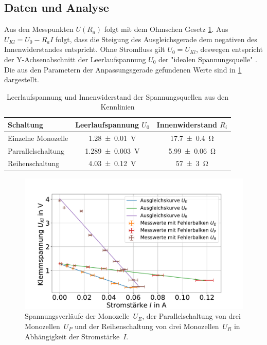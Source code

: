 \subsection{Daten und Analyse}


Aus den Messpunkten $U(R_a)$ folgt mit dem Ohmschen Gesetz \cref{fig:batt-ges-u}. Aus $U_{Kl}=U_0-R_a I$ folgt, dass die Steigung des Ausgleichsgerade dem negativen des Innenwiderstandes entspricht. Ohne Stromfluss gilt $U_0=U_{Kl}$, deswegen entspricht der Y-Achsenabschnitt der Leerlaufspannung $U_0$ der "idealen Spannungsquelle" \cite{lw}. Die aus den Parametern der Anpassungsgerade gefundenen Werte sind in \cref{tab:batt-U-R} dargestellt.





\begin{table}
	\caption{Leerlaufspannung und Innenwiderstand der Spannungsquellen aus den Kennlinien}
	\centering
	\begin{tabular}{|l||c|c|}
		\hline 
		Schaltung 	& Leerlaufspannung $U_0$ & Innenwiderstand $R_i$ \\ 
		\hline \hline
		Einzelne Monozelle	& \SI{1.28+-0.01}{V}  & \SI{17.7+-0.4}{\ohm } \\ 
		\hline  
		Parrallelschaltung	& \SI{1.289+-0.003}{V } &\SI{5.99+-0.06}{\ohm }  \\ 
		\hline   
		Reihenschaltung	& \SI{4.03+-0.12}{V } &\SI{57+-3}{\ohm }  \\ 
		\hline 
	\end{tabular} 
	
	\label{tab:batt-U-R}
	
\end{table}


 


\begin{figure}[h]
	\centering
	\includegraphics[width=0.9\linewidth]{"auswertung/Auswertung Innenwiderstand/Batterie Gesamt U"}
	\caption{Spannungsverläufe der Monozelle~$U_E$, der Parallelschaltung von drei Monozellen~$U_P$ und der Reihenschaltung von drei Monozellen~$U_R$ in Abhängigkeit der Stromstärke~$I$.}
	\label{fig:batt-ges-u}
\end{figure}










